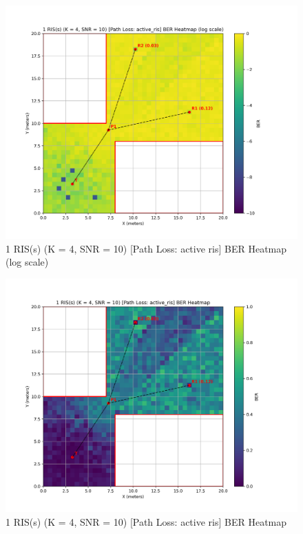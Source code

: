 \begin{figure}[H]
  \centering
  \includegraphics[width=0.8\linewidth]{imgs/heatmap-simulations/1 RIS(s) (K = 4, SNR = 10) [Path Loss_ active_ris] BER Heatmap (log scale).png}
  \caption{1 RIS(s) (K = 4, SNR = 10) [Path Loss: active ris] BER Heatmap (log scale)}
\end{figure}

\begin{figure}[H]
  \centering
  \includegraphics[width=0.8\linewidth]{imgs/heatmap-simulations/1 RIS(s) (K = 4, SNR = 10) [Path Loss_ active_ris] BER Heatmap.png}
  \caption{1 RIS(s) (K = 4, SNR = 10) [Path Loss: active ris] BER Heatmap}
\end{figure}

